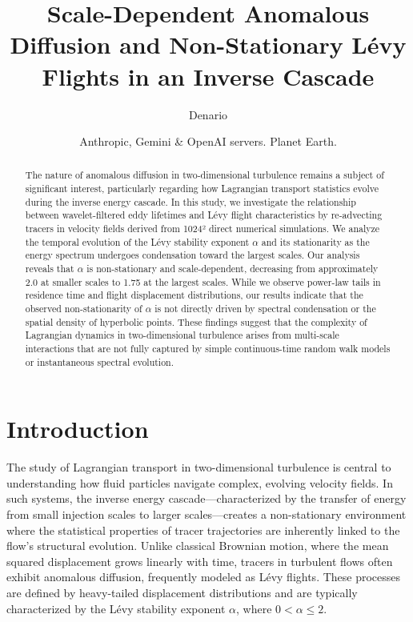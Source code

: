\documentclass[]{article}
\begin{document}
\title{Scale-Dependent Anomalous Diffusion and Non-Stationary Lévy Flights in an Inverse Cascade}

\author{Denario}
\date{Anthropic, Gemini \& OpenAI servers. Planet Earth.}

\maketitle
\begin{abstract}
The nature of anomalous diffusion in two-dimensional turbulence remains a subject of significant interest, particularly regarding how Lagrangian transport statistics evolve during the inverse energy cascade. In this study, we investigate the relationship between wavelet-filtered eddy lifetimes and Lévy flight characteristics by re-advecting tracers in velocity fields derived from 1024² direct numerical simulations. We analyze the temporal evolution of the Lévy stability exponent $\alpha$ and its stationarity as the energy spectrum undergoes condensation toward the largest scales. Our analysis reveals that $\alpha$ is non-stationary and scale-dependent, decreasing from approximately 2.0 at smaller scales to 1.75 at the largest scales. While we observe power-law tails in residence time and flight displacement distributions, our results indicate that the observed non-stationarity of $\alpha$ is not directly driven by spectral condensation or the spatial density of hyperbolic points. These findings suggest that the complexity of Lagrangian dynamics in two-dimensional turbulence arises from multi-scale interactions that are not fully captured by simple continuous-time random walk models or instantaneous spectral evolution.
\end{abstract}








\section{Introduction}
\label{sec:intro}
The study of Lagrangian transport in two-dimensional turbulence is central to understanding how fluid particles navigate complex, evolving velocity fields. In such systems, the inverse energy cascade—characterized by the transfer of energy from small injection scales to larger scales—creates a non-stationary environment where the statistical properties of tracer trajectories are inherently linked to the flow's structural evolution. Unlike classical Brownian motion, where the mean squared displacement grows linearly with time, tracers in turbulent flows often exhibit anomalous diffusion, frequently modeled as Lévy flights. These processes are defined by heavy-tailed displacement distributions and are typically characterized by the Lévy stability exponent $\alpha$, where $0 < \alpha \leq 2$.
\end{document}
